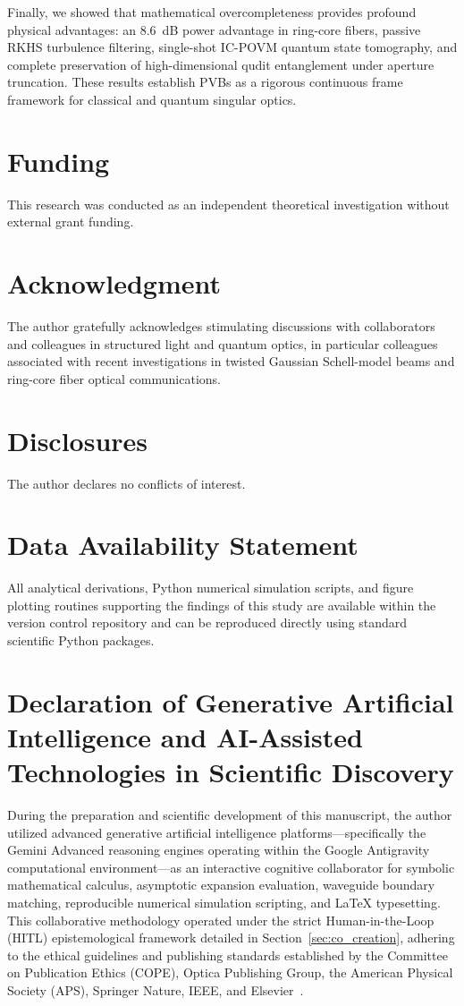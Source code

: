 \documentclass[11pt,a4paper]{article}
\begin{document}
Finally, we showed that mathematical overcompleteness provides profound physical advantages: an 8.6~dB power advantage in ring-core fibers, passive RKHS turbulence filtering, single-shot IC-POVM quantum state tomography, and complete preservation of high-dimensional qudit entanglement under aperture truncation. These results establish PVBs as a rigorous continuous frame framework for classical and quantum singular optics.

\section*{Funding}
This research was conducted as an independent theoretical investigation without external grant funding.

\section*{Acknowledgment}
The author gratefully acknowledges stimulating discussions with collaborators and colleagues in structured light and quantum optics, in particular colleagues associated with recent investigations in twisted Gaussian Schell-model beams and ring-core fiber optical communications.

\section*{Disclosures}
The author declares no conflicts of interest.

\section*{Data Availability Statement}
All analytical derivations, Python numerical simulation scripts, and figure plotting routines supporting the findings of this study are available within the version control repository and can be reproduced directly using standard scientific Python packages.

\section*{Declaration of Generative Artificial Intelligence and AI-Assisted Technologies in Scientific Discovery}
\label{sec:ai_declaration}
During the preparation and scientific development of this manuscript, the author utilized advanced generative artificial intelligence platforms---specifically the Gemini Advanced reasoning engines operating within the Google Antigravity computational environment---as an interactive cognitive collaborator for symbolic mathematical calculus, asymptotic expansion evaluation, waveguide boundary matching, reproducible numerical simulation scripting, and LaTeX typesetting. This collaborative methodology operated under the strict Human-in-the-Loop (HITL) epistemological framework detailed in Section~\ref{sec:co_creation}, adhering to the ethical guidelines and publishing standards established by the Committee on Publication Ethics (COPE), Optica Publishing Group, the American Physical Society (APS), Springer Nature, IEEE, and Elsevier~\cite{Jauhiainen2026,Haber2025,OToole2024,VillaescusaNavarro2026,Chandra2026TheoPhysEval,Kacena2024}.
\end{document}
